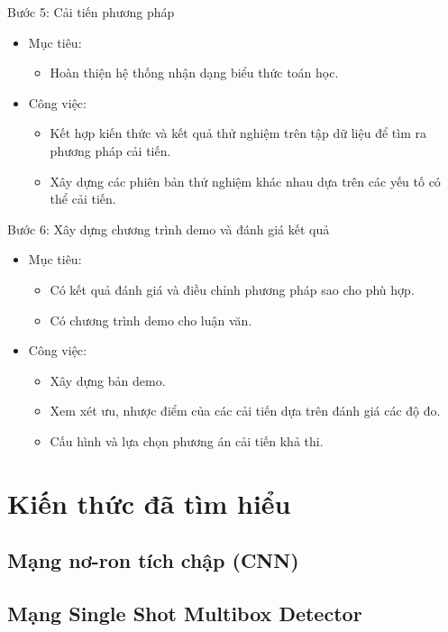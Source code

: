 \documentclass[a4paper,12pt]{article}
\begin{document}
	Bước 5: Cải tiến phương pháp
	\begin{itemize}
		\item Mục tiêu:
		\begin{itemize}
			\item Hoàn thiện hệ thống nhận dạng biểu thức toán học.
		\end{itemize}
		\item Công việc:
		\begin{itemize}
			\item Kết hợp kiến thức và kết quả thử nghiệm trên tập dữ liệu để tìm ra phương pháp cải tiến.
			\item Xây dựng các phiên bản thử nghiệm khác nhau dựa trên các yếu tố có thể cải tiến.
			
		\end{itemize}
	\end{itemize}
	Bước 6: Xây dựng chương trình demo và đánh giá kết quả
	\begin{itemize}
		\item Mục tiêu:
		\begin{itemize}
			\item Có kết quả đánh giá và điều chỉnh phương pháp sao cho phù hợp.
			\item Có chương trình demo cho luận văn.
		\end{itemize}
		\item Công việc:
		\begin{itemize}
			\item Xây dựng bản demo.
			\item Xem xét ưu, nhược điểm của các cải tiến dựa trên đánh giá các độ đo.
			\item Cấu hình và lựa chọn phương án cải tiến khả thi. 
		\end{itemize}
	\end{itemize}
	
	
	
	
	\newpage
	\section{Kiến thức đã tìm hiểu}
	\subsection{Mạng nơ-ron tích chập (CNN)}
	
	\subsection{Mạng Single Shot Multibox Detector\cite{liu2016ssd}}
	
\end{document}
